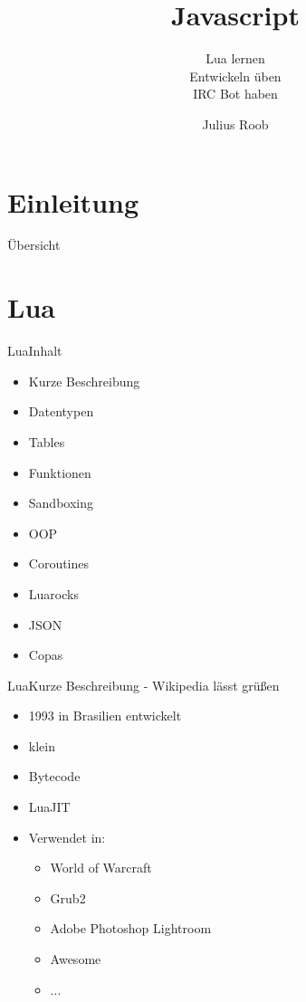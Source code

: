 \documentclass{beamer}
\author{Julius Roob}
\title{Javascript}
\subtitle{Lua lernen \checked\\Entwickeln üben \checked\\IRC Bot haben \checked}
\institute{Chaos inKL.}
\date{}
\begin{document}
	\section{Einleitung}
		\begin{frame}
			\titlepage
		\end{frame}
	
		\begin{frame}{Übersicht}
			\tableofcontents
		\end{frame}
	
	
	\section{Lua}
		\begin{frame}{Lua}{Inhalt}
			\begin{itemize}
				\item Kurze Beschreibung
				\item Datentypen
				\item Tables
				\item Funktionen
				\item Sandboxing
				\item OOP
				\item Coroutines
				\item Luarocks
				\item JSON
				\item Copas
			\end{itemize}
		\end{frame}

		\begin{frame}{Lua}{Kurze Beschreibung - Wikipedia lässt grüßen}
			\begin{itemize}
				\item 1993 in Brasilien entwickelt
				\item klein
				\item Bytecode
				\item LuaJIT
				\item Verwendet in:
					\begin{itemize}
						\item World of Warcraft
						\item Grub2
						\item Adobe Photoshop Lightroom
						\item Awesome
						\item ...
					\end{itemize}
			\end{itemize}
		\end{frame}
\end{document}
